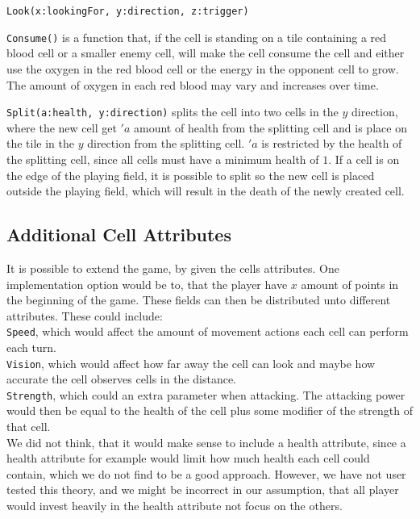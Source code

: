 \verb|Look(x:lookingFor, y:direction, z:trigger)| \newline 

\verb|Consume()| is a function that, if the cell is standing on a tile containing a red blood cell or a smaller enemy cell, will make the cell consume the cell and either use the oxygen in the red blood cell or the energy in the opponent cell to grow.
The amount of oxygen in each red blood may vary and increases over time.\newline


\verb|Split(a:health, y:direction)| splits the cell into two cells in the $y$ direction, where the new cell get $'a$ amount of health from the splitting cell and is place on the tile in the $y$ direction from the splitting cell.
$'a$ is restricted by the health of the splitting cell, since all cells must have a minimum health of $1$.
If a cell is on the edge of the playing field, it is possible to split so the new cell is placed outside the playing field, which will result in the death of the newly created cell.

\subsection{Additional Cell Attributes}

It is possible to extend the game, by given the cells attributes. One implementation option would be to, that the player have $x$ amount of points in the beginning of the game. These fields can then be distributed unto different attributes. These could include:\\

\verb|Speed|, which would affect the amount of movement actions each cell can perform each turn.\\
\verb|Vision|, which would affect how far away the cell can look and maybe how accurate the cell observes cells in the distance.\\
\verb|Strength|, which could an extra parameter when attacking. The attacking power would then be equal to the health of the cell plus some modifier of the strength of that cell.\\

We did not think, that it would make sense to include a health attribute, since a health attribute for example would limit how much health each cell could contain, which we do not find to be a good approach. However, we have not user tested this theory, and we might be incorrect in our assumption, that all player would invest heavily in the health attribute not focus on the others.